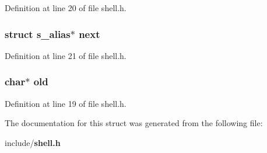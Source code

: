 Definition at line 20 of file shell.\-h.

\subsubsection[{next}]{\setlength{\rightskip}{0pt plus 5cm}struct {\bf s\-\_\-alias}$\ast$ next}\label{structs__alias_a228d8745e3b5e095fe1a256c236a8d9a}


Definition at line 21 of file shell.\-h.

\subsubsection[{old}]{\setlength{\rightskip}{0pt plus 5cm}char$\ast$ old}\label{structs__alias_a32487cbad62d1e9a7ea00010f5dc58bb}


Definition at line 19 of file shell.\-h.



The documentation for this struct was generated from the following file\-:\begin{DoxyCompactItemize}
\item 
include/{\bf shell.\-h}\end{DoxyCompactItemize}
